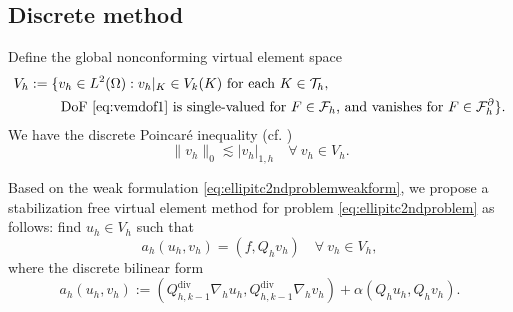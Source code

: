 \documentclass[10pt]{amsart}
\renewcommand{\div}{\operatorname{div}}
\numberwithin{equation}{section}
\begin{document}
\subsection{Discrete method}
Define the global nonconforming virtual element space
\begin{align*}
V_h&:=\{v_h\in L^2(\Omega): v_h|_K\in V_k(K) \textrm{ for each } K\in\mathcal T_h, \textrm{  } \\
&\qquad\; \textrm{DoF \eqref{eq:vemdof1} is single-valued for $F\in\mathcal F_h$, and vanishes for $F\in \mathcal F_h^{\partial}$}\}.
\end{align*}
We have the discrete Poincar\'e inequality (cf. \cite[(4.16)]{ChenHuang2020ncvem})
\begin{equation}\label{eq:vempoincareineqlty}
\|v_h\|_0\lesssim |v_h|_{1,h} \quad\forall~v_h\in V_h.
\end{equation}

Based on the weak formulation \eqref{eq:ellipitc2ndproblemweakform}, we propose a stabilization free virtual element method for problem \eqref{eq:ellipitc2ndproblem} as follows: find $u_h\in V_h$ such that
\begin{equation}\label{eq:vem}
a_h(u_h, v_h)=(f, Q_hv_h)\quad\forall~v_h\in V_h,
\end{equation}
where the discrete bilinear form 
\[
a_h(u_h, v_h):=(Q_{h,k-1}^{\div}\nabla_h u_h, Q_{h,k-1}^{\div}\nabla_h v_h)+\alpha(Q_hu_h, Q_hv_h).
\]
\end{document}
